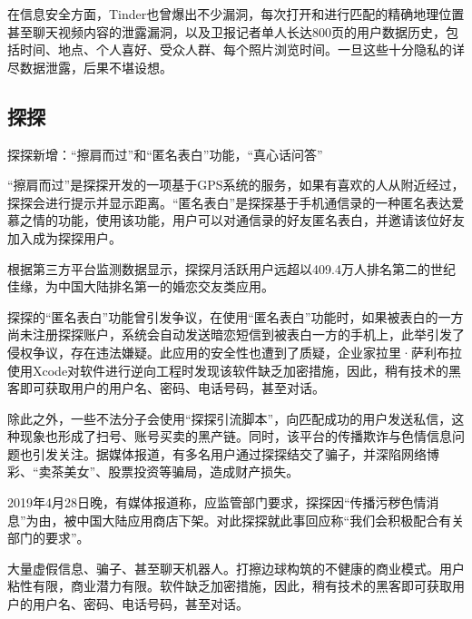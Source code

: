 \documentclass[UTF8]{ctexart}
\begin{document}
在信息安全方面，Tinder也曾爆出不少漏洞，每次打开和进行匹配的精确地理位置甚至聊天视频内容的泄露漏洞，以及卫报记者单人长达800页的用户数据历史，包括时间、地点、个人喜好、受众人群、每个照片浏览时间。一旦这些十分隐私的详尽数据泄露，后果不堪设想。

\subsection{探探}

\begin{tcolorbox}
    探探新增：“擦肩而过”和“匿名表白”功能，“真心话问答”

    “擦肩而过”是探探开发的一项基于GPS系统的服务，如果有喜欢的人从附近经过，探探会进行提示并显示距离。“匿名表白”是探探基于手机通信录的一种匿名表达爱慕之情的功能，使用该功能，用户可以对通信录的好友匿名表白，并邀请该位好友加入成为探探用户。

    根据第三方平台监测数据显示，探探月活跃用户远超以409.4万人排名第二的世纪佳缘，为中国大陆排名第一的婚恋交友类应用。

    探探的“匿名表白”功能曾引发争议，在使用“匿名表白”功能时，如果被表白的一方尚未注册探探账户，系统会自动发送暗恋短信到被表白一方的手机上，此举引发了侵权争议，存在违法嫌疑。此应用的安全性也遭到了质疑，企业家拉里·萨利布拉使用Xcode对软件进行逆向工程时发现该软件缺乏加密措施，因此，稍有技术的黑客即可获取用户的用户名、密码、电话号码，甚至对话。

    除此之外，一些不法分子会使用“探探引流脚本”，向匹配成功的用户发送私信，这种现象也形成了扫号、账号买卖的黑产链。同时，该平台的传播欺诈与色情信息问题也引发关注。据媒体报道，有多名用户通过探探结交了骗子，并深陷网络博彩、“卖茶美女”、股票投资等骗局，造成财产损失。

    2019年4月28日晚，有媒体报道称，应监管部门要求，探探因“传播污秽色情消息”为由，被中国大陆应用商店下架。对此探探就此事回应称“我们会积极配合有关部门的要求”。\cite{WikiTantan}
\end{tcolorbox}

大量虚假信息、骗子、甚至聊天机器人。打擦边球构筑的不健康的商业模式。用户粘性有限，商业潜力有限。软件缺乏加密措施，因此，稍有技术的黑客即可获取用户的用户名、密码、电话号码，甚至对话。
\end{document}
